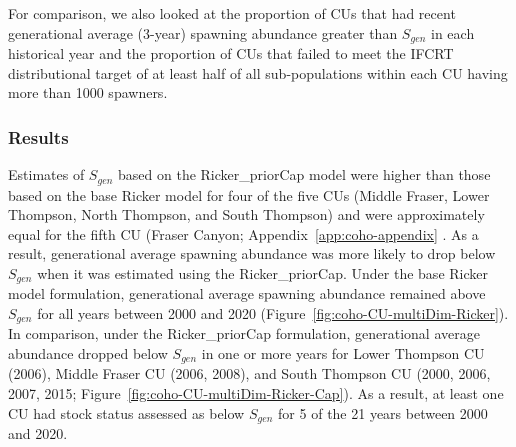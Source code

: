 \documentclass[11pt]{book}
\begin{document}
For comparison, we also looked at the proportion of CUs that had recent generational average (3-year) spawning abundance greater than \(S_{gen}\) in each historical year and the proportion of CUs that failed to meet the IFCRT distributional target of at least half of all sub-populations within each CU having more than 1000 spawners.

\hypertarget{results}{%
\subsubsection{Results}\label{results}}

Estimates of \(S_{gen}\) based on the Ricker\_priorCap model were higher than those based on the base Ricker model for four of the five CUs (Middle Fraser, Lower Thompson, North Thompson, and South Thompson) and were approximately equal for the fifth CU (Fraser Canyon; Appendix~\ref{app:coho-appendix} . As a result, generational average spawning abundance was more likely to drop below \(S_{gen}\) when it was estimated using the Ricker\_priorCap. Under the base Ricker model formulation, generational average spawning abundance remained above \(S_{gen}\) for all years between 2000 and 2020 (Figure~\ref{fig:coho-CU-multiDim-Ricker}). In comparison, under the Ricker\_priorCap formulation, generational average abundance dropped below \(S_{gen}\) in one or more years for Lower Thompson CU (2006), Middle Fraser CU (2006, 2008), and South Thompson CU (2000, 2006, 2007, 2015; Figure~\ref{fig:coho-CU-multiDim-Ricker-Cap}). As a result, at least one CU had stock status assessed as below \(S_{gen}\) for 5 of the 21 years between 2000 and 2020.
\end{document}
